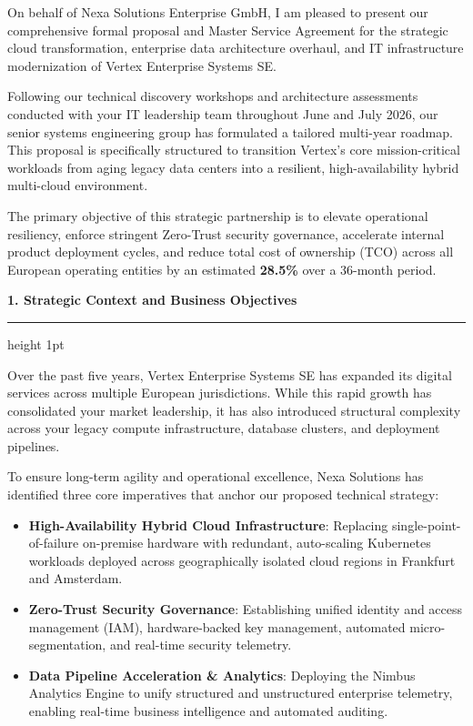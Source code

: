 \documentclass[english,11pt]{g-brief}
\newcommand{\lettersection}[1]{%
  \vspace{3.5mm}%
  {\color{NavyPrimary}\Large\bfseries #1}\par%
  \vspace{1mm}%
  {\color{SlateSecondary}\hrule height 1pt}\par%
  \vspace{2.5mm}%
}
\begin{document}
\begin{g-brief}
On behalf of Nexa Solutions Enterprise GmbH, I am pleased to present our comprehensive formal proposal and Master Service Agreement for the strategic cloud transformation, enterprise data architecture overhaul, and IT infrastructure modernization of Vertex Enterprise Systems SE.

Following our technical discovery workshops and architecture assessments conducted with your IT leadership team throughout June and July 2026, our senior systems engineering group has formulated a tailored multi-year roadmap. This proposal is specifically structured to transition Vertex's core mission-critical workloads from aging legacy data centers into a resilient, high-availability hybrid multi-cloud environment.

\vspace{2.5mm}
\begin{tcolorbox}[
    colback=WarmGray,
    colframe=NavyPrimary,
    boxrule=1pt,
    arc=1.5mm,
    top=2.5mm,
    bottom=2.5mm,
    left=3.5mm,
    right=3.5mm,
    title=\textcolor{white}{\small\faCheckCircle\ \textbf{Executive Summary \& Strategic Imperatives}}
]
\textcolor{DarkText}{%
The primary objective of this strategic partnership is to elevate operational resiliency, enforce stringent Zero-Trust security governance, accelerate internal product deployment cycles, and reduce total cost of ownership (TCO) across all European operating entities by an estimated \textbf{28.5\%} over a 36-month period.}
\end{tcolorbox}

\lettersection{1. Strategic Context and Business Objectives}

Over the past five years, Vertex Enterprise Systems SE has expanded its digital services across multiple European jurisdictions. While this rapid growth has consolidated your market leadership, it has also introduced structural complexity across your legacy compute infrastructure, database clusters, and deployment pipelines. 

To ensure long-term agility and operational excellence, Nexa Solutions has identified three core imperatives that anchor our proposed technical strategy:

\begin{itemize}[leftmargin=*,label=\textcolor{SlateSecondary}{\small\faCheckCircle},itemsep=1.5mm]
    \item \textbf{High-Availability Hybrid Cloud Infrastructure}: Replacing single-point-of-failure on-premise hardware with redundant, auto-scaling Kubernetes workloads deployed across geographically isolated cloud regions in Frankfurt and Amsterdam.
    \item \textbf{Zero-Trust Security Governance}: Establishing unified identity and access management (IAM), hardware-backed key management, automated micro-segmentation, and real-time security telemetry.
    \item \textbf{Data Pipeline Acceleration \& Analytics}: Deploying the Nimbus Analytics Engine to unify structured and unstructured enterprise telemetry, enabling real-time business intelligence and automated auditing.
\end{itemize}


\end{g-brief}
\end{document}
